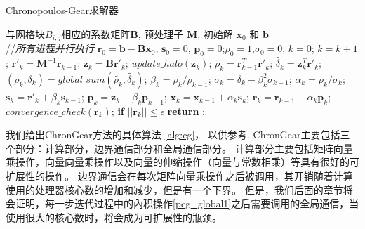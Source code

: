 \begin{algorithm}[!t]
\caption{Chronopoulos-Gear求解器}
\label{alg:cg}
\begin{algorithmic}[1]
\REQUIRE   与网格块$B_{i,j}$相应的系数矩阵$\textbf{B}$, 预处理子 $\textbf{M}$, 初始解 $\textbf{x}_0$ 和 $\textbf{b}$  \\
//\qquad    \textit{所有进程并行执行}
\STATE $\textbf{r}_0 = \textbf{b}-\textbf{B}\textbf{x}_0$, $\textbf{s}_0 =0$, $\textbf{p}_0 =0$;\quad $\rho_0=1$,$\sigma_0=0$, $k=0$;
\STATE $k=k+1$;
\STATE $\textbf{r}'_{k} =\textbf{M}^{-1}\textbf{r}_{k-1}$; \label{pcg_scale0} 
\STATE $\textbf{z}_k = \textbf{B}\textbf{r}'_{k}$; \label{pcg_mat}
\STATE $update\_halo(\textbf{z}_{k})$;  \label{pcg_bc1}
\STATE $\tilde{\rho_k} = \textbf{r}_{k-1}^T\textbf{r}'_{k}$;\label{pcg_dot1}
\STATE $\tilde{\delta_k} = \textbf{z}_k^T\textbf{r}'_k$;\label{pcg_dot2}
\STATE $(\rho_k,\delta_k) = global\_sum(\tilde{\rho_k},\tilde{\delta_k})$;\label{pcg_global1} 
\STATE $\beta_k = \rho_k / \rho_{k-1}$;\label{pcg_beta}
\STATE $\sigma_k = \delta_k - \beta_k^2\sigma_{k-1}$;\label{pcg_sigma}
\STATE $\alpha_k = \rho_k /\sigma_{k}$;\label{pcg_alpha}
\STATE $\textbf{s}_k = \textbf{r}'_{k} +\beta_k\textbf{s}_{k-1}$;\label{pcg_scale1}
\STATE $\textbf{p}_k = \textbf{z}_{k} +\beta_k\textbf{p}_{k-1}$;\label{pcg_scale2}
\STATE $\textbf{x}_k =\textbf{x}_{k-1} +\alpha_k \textbf{s}_k$;\label{pcg_scale3}
\STATE $\textbf{r}_k =\textbf{r}_{k-1} -\alpha_k\textbf{p}_k$;\label{pcg_scale4}
\STATE $convergence\_check(\textbf{r}_{k})$;  
\STATE \textbf{if} $||\textbf{r}_k|| \le \epsilon$  \textbf{return} ;
\ENDIF
\ENDWHILE
\end{algorithmic}
\end{algorithm}

我们给出ChronGear方法的具体算法
\ref{alg:cg}， 以供参考.  ChronGear主要包括三个部分：计算部分，边界通信部分和全局通信部分。
计算部分主要包括矩阵向量乘操作，向量向量乘操作以及向量的伸缩操作（向量与常数相乘）等具有很好的可扩展性的操作。 
边界通信会在每次矩阵向量乘操作之后被调用，其开销随着计算使用的处理器核心数的增加和减少，但是有一个下界。 
但是，我们后面的章节将会证明，每一步迭代过程中的內积操作\ref{pcg_global1}之后需要调用的全局通信，当使用很大的核心数时，将会成为可扩展性的瓶颈。
 

